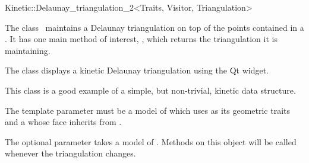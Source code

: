 

\begin{ccRefClass}{Kinetic::Delaunay_triangulation_2<Traits, Visitor, Triangulation>}  %


\ccDefinition
  
The class \ccRefName\ maintains a Delaunay triangulation on top of the
points contained in a . It has one
main method of interest, , which returns the
triangulation it is maintaining.

The class  displays a kinetic Delaunay
triangulation using the Qt widget.

This class is a good example of a simple, but non-trivial, kinetic
data structure.

The  template parameter must be a model of
 which uses
 as its geometric traits and a
 whose face inherits from
.

The optional  parameter takes a model of
. Methods on this object will be called
whenever the triangulation changes.


\ccIsModel



\ccTypes



\end{ccRefClass}
